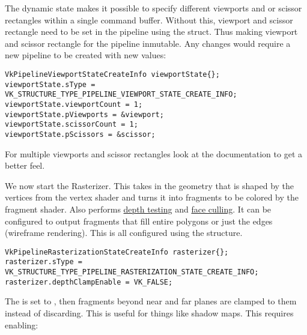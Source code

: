 \par The dynamic state makes it possible to specify different viewports and or scissor rectangles within a single command buffer. Without this, viewport and scissor rectangle need to be set in the pipeline using the  struct. Thus making viewport and scissor rectangle for the pipeline inmutable. Any changes would require a new pipeline to be created with new values:

\begin{center}
\begin{minipage}{0.95\linewidth}
\begin{lstlisting}
VkPipelineViewportStateCreateInfo viewportState{};
viewportState.sType = VK_STRUCTURE_TYPE_PIPELINE_VIEWPORT_STATE_CREATE_INFO;
viewportState.viewportCount = 1;
viewportState.pViewports = &viewport;
viewportState.scissorCount = 1;
viewportState.pScissors = &scissor;
\end{lstlisting}
\end{minipage}
\end{center}

\par For multiple viewports and scissor rectangles look at the documentation to get a better feel.

\par We now start the Rasterizer. This takes in the geometry that is shaped by the vertices from the vertex shader and turns it into fragments to be colored by the fragment shader. Also performs \href{https://en.wikipedia.org/wiki/Z-buffering}{depth testing} and \href{https://en.wikipedia.org/wiki/Back-face_culling}{face culling}. It can be configured to output fragments that fill entire polygons or just the edges (wireframe rendering). This is all configured using the  structure.

\begin{center}
\begin{minipage}{0.95\linewidth}
\begin{lstlisting}
VkPipelineRasterizationStateCreateInfo rasterizer{};
rasterizer.sType = VK_STRUCTURE_TYPE_PIPELINE_RASTERIZATION_STATE_CREATE_INFO;
rasterizer.depthClampEnable = VK_FALSE;
\end{lstlisting}
\end{minipage}
\end{center}

\par The  is set to , then fragments beyond near and far planes are clamped to them instead of discarding. This is useful for things like shadow maps. This requires enabling:

